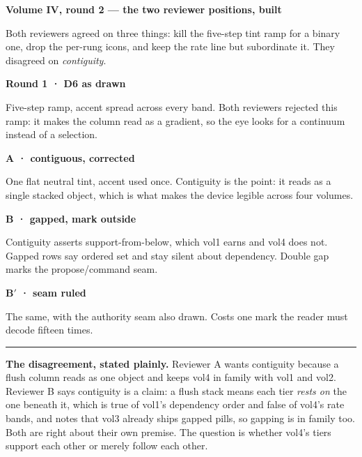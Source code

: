 \documentclass[11pt]{book}
\begin{document}
\thispagestyle{empty}
{\large\bfseries Volume IV, round 2 --- the two reviewer positions, built}\par\vspace{2pt}
{\footnotesize Both reviewers agreed on three things: kill the five-step tint ramp for a binary
one, drop the per-rung icons, and keep the rate line but subordinate it. They disagreed on
\emph{contiguity}.}\par\vspace{9mm}
\newcommand{\slot}[3]{\begin{minipage}[t][7.4cm][t]{3.9cm}#1\par\vspace{4mm}%
  {\footnotesize\bfseries #2}\par{\fontsize{7}{8.6}\selectfont #3}\end{minipage}}
\noindent
\slot{\dSix}{Round 1 · D6 as drawn}{Five-step ramp, accent spread across every band. Both
reviewers rejected this ramp: it makes the column read as a gradient, so the eye looks for a
continuum instead of a selection.}\hfill
\slot{\dSixR}{A · contiguous, corrected}{One flat neutral tint, accent used once. Contiguity
is the point: it reads as a single stacked object, which is what makes the device legible
across four volumes.}\hfill
\slot{\dSeven}{B · gapped, mark outside}{Contiguity asserts support-from-below, which vol1
earns and vol4 does not. Gapped rows say ordered set and stay silent about dependency. Double
gap marks the propose/command seam.}\hfill
\slot{\dSevenB}{B$'$ · seam ruled}{The same, with the authority seam also drawn. Costs one
mark the reader must decode fifteen times.}
\par\vspace{2mm}\rule{\textwidth}{0.4pt}\par\vspace{2mm}
{\footnotesize\textbf{The disagreement, stated plainly.} Reviewer A wants contiguity because a
flush column reads as one object and keeps vol4 in family with vol1 and vol2. Reviewer B says
contiguity is a claim: a flush stack means each tier \emph{rests on} the one beneath it, which
is true of vol1's dependency order and false of vol4's rate bands, and notes that vol3 already
ships gapped pills, so gapping is in family too. Both are right about their own premise. The
question is whether vol4's tiers support each other or merely follow each other.}
\end{document}
